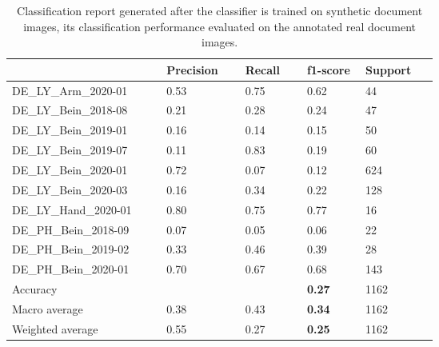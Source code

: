 \begin{center}
\begin{table}[H]
    \begin{center}
    \begin{tabular}{P{0.22\linewidth} P{0.10\linewidth} P{0.10\linewidth} P{0.10\linewidth} P{0.10\linewidth}} 
	        \toprule
            & Precision & Recall & f1-score & Support\\[0.0ex] 
        \midrule
        DE\_LY\_Arm\_2020-01 & 0.53 & 0.75 & 0.62 & 44\\[0.0ex]
        \midrule
        DE\_LY\_Bein\_2018-08 & 0.21 & 0.28 & 0.24 & 47\\[0.0ex]
        \midrule
        DE\_LY\_Bein\_2019-01 & 0.16 & 0.14 & 0.15 & 50\\[0.0ex]
        \midrule
        DE\_LY\_Bein\_2019-07 & 0.11 & 0.83 & 0.19 & 60\\[0.0ex]
        \midrule
        DE\_LY\_Bein\_2020-01 & 0.72 & 0.07 & 0.12 & 624\\[0.0ex]
        \midrule
        DE\_LY\_Bein\_2020-03 & 0.16 & 0.34 & 0.22 & 128\\[0.0ex]
        \midrule
        DE\_LY\_Hand\_2020-01 & 0.80 & 0.75 & 0.77 & 16\\[0.0ex]
        \midrule
        DE\_PH\_Bein\_2018-09 & 0.07 & 0.05 & 0.06 & 22\\[0.0ex]
        \midrule
        DE\_PH\_Bein\_2019-02 & 0.33 & 0.46 & 0.39 & 28\\[0.0ex]
        \midrule
        DE\_PH\_Bein\_2020-01 & 0.70 & 0.67 & 0.68 & 143\\[0.0ex]
        \midrule
        \midrule
        Accuracy              &      &      & \bf{0.27} & 1162\\[0.0ex]
        Macro average             & 0.38 & 0.43 &  \bf{0.34} & 1162\\[0.0ex]
        Weighted average          & 0.55 & 0.27 &  \bf{0.25} & 1162\\[0.0ex]
        \bottomrule
    \end{tabular}
    \caption[Classification report generated after the classifier is trained on synthetic document images, its classification performance evaluated on the annotated real document images.]{Classification report generated after the classifier is trained on synthetic document images, its classification performance evaluated on the annotated real document images.}
    \label{table:SyntheticClassificationReport}
    \end{center}
\end{table}
\end{center}











